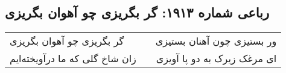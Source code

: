 \begin{center}
\section*{رباعی شماره ۱۹۱۳: گر بگریزی چو آهوان بگریزی}
\label{sec:1913}
\begin{longtable}{l p{0.5cm} r}
گر بگریزی چو آهوان بگریزی
&&
ور بستیزی چون آهنان بستیزی
\\
زان شاخ گلی که ما درآویخته‌ایم
&&
ای مرغک زیرک به دو پا آویزی
\\
\end{longtable}
\end{center}
